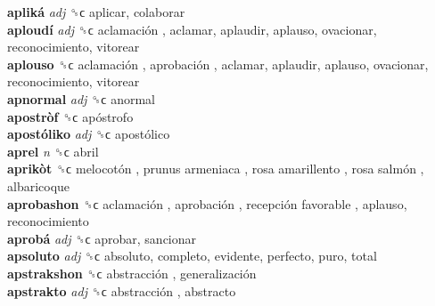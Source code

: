 \textbf{apliká} \emph{adj}  ␝ϲ  aplicar, colaborar  \\
\textbf{aploudí} \emph{adj}  ␝ϲ   aclamación , aclamar, aplaudir, aplauso, ovacionar, reconocimiento, vitorear  \\
\textbf{aplouso} ␝ϲ   aclamación ,  aprobación , aclamar, aplaudir, aplauso, ovacionar, reconocimiento, vitorear  \\
\textbf{apnormal} \emph{adj}  ␝ϲ  anormal  \\
\textbf{apostròf} ␝ϲ   apóstrofo   \\
\textbf{apostóliko} \emph{adj}  ␝ϲ   apostólico   \\
\textbf{aprel} \emph{n}  ␝ϲ  abril  \\
\textbf{aprikòt} ␝ϲ   melocotón ,  prunus armeniaca ,  rosa amarillento ,  rosa salmón , albaricoque  \\
\textbf{aprobashon} ␝ϲ   aclamación ,  aprobación ,  recepción favorable , aplauso, reconocimiento  \\
\textbf{aprobá} \emph{adj}  ␝ϲ  aprobar, sancionar  \\
\textbf{apsoluto} \emph{adj}  ␝ϲ  absoluto, completo, evidente, perfecto, puro, total  \\
\textbf{apstrakshon} ␝ϲ   abstracción ,  generalización   \\
\textbf{apstrakto} \emph{adj}  ␝ϲ   abstracción , abstracto  \\
